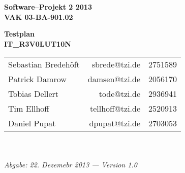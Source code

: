 \documentclass[fontsize=12pt,paper=a4,twoside]{scrartcl}
\begin{document}
  \thispagestyle{fancy}
  \fancyhead[LO,RE]{ }
  \fancyfoot[C]{}

  \vspace{3cm}

  \begin{minipage}[H]{\textwidth}
  \begin{center}
  \bf
  \Large
  Software--Projekt 2 2013\\
  \smallskip
  \small
  VAK 03-BA-901.02\\
  \vspace{3cm}
  \end{center}
  \end{minipage}
  \begin{minipage}[H]{\textwidth}
  \begin{center}
  \vspace{1cm}
  \bf
  \Large Testplan\\
  \vspace{3ex} \small IT\_R3V0LUT10N\\
  \vfill
  \end{center}
  \end{minipage}
  \vfill
  \begin{minipage}[H]{\textwidth}
  \begin{center}
  \sf
  \begin{tabular}{lrr}
 			Sebastian Bredehöft & sbrede@tzi.de & 2751589\\
 			Patrick Damrow & damsen@tzi.de & 2056170\\
 			Tobias Dellert & tode@tzi.de & 2936941\\
 			Tim Ellhoff & tellhoff@tzi.de & 2520913\\
 			Daniel Pupat & dpupat@tzi.de & 2703053\\
  \end{tabular}
  \\ ~
  \vspace{2cm}
  \\
  \it Abgabe: 22. Dezemebr 2013 --- Version 1.0\\ ~
  \end{center}
  \end{minipage}

\end{document}
